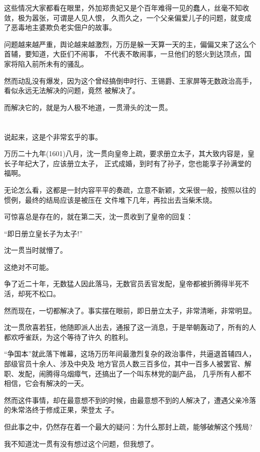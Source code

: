 \documentclass[11pt,a4paper,onecolumn]{article}
\begin{document}
这些情况大家都看在眼里，外加郑贵妃又是个百年难得一见的蠢人，丝毫不知收敛，极为嚣张，可谓是人见人恨，
久而久之，一个父亲偏爱儿子的问题，就变成了恶毒地主婆欺负老实佃户的故事。

问题越来越严重，舆论越来越激烈，万历是躲一天算一天的主，偏偏又来了这么个首辅，要知道，大臣们不闹事，
不代表不敢闹事，一旦他们的怒火到达顶点，国家将陷入前所未有的骚乱。

然而动乱没有爆发，因为这个曾经搞倒申时行、王锡爵、王家屏等无数政治高手，看似永远无法解决的问题，竟然
被解决了。

而解决它的，就是为人极不地道，一贯滑头的沈一贯。

\section[\thesection]{}

说起来，这是个非常玄乎的事。

万历二十九年(1601)八月，沈一贯向皇帝上疏，要求册立太子，其大致内容是，皇长子年纪大了，应该册立太子，
正式成婚，到时有了孙子，您也能享子孙满堂的福啊。

无论怎么看，这都是一封内容平平的奏疏，立意不新颖，文采很一般，按照以往的惯例，最终的结局应该是被压在
文件堆下几年，再拉出去当柴禾烧。

可惊喜总是存在的，就在第二天，沈一贯收到了皇帝的回复：

``即日册立皇长子为太子!''

沈一贯当时就懵了。

这绝对不可能。

争了近二十年，无数猛人因此落马，无数官员丢官发配，皇帝都被折腾得半死不活，却死不松口。

然而现在，一切都解决了。事实摆在眼前，即日册立太子，非常清晰，非常明显。

沈一贯欣喜若狂，他随即派人出去，通报了这一消息，于是举朝轰动了，所有的人都欢呼雀跃，为这个等待了许久
的胜利。

``争国本''就此落下帷幕，这场万历年间最激烈复杂的政治事件，共逼退首辅四人，部级官员十余人、涉及中央及
地方官员人数三百多位，其中一百多人被罢官、解职、发配，闹腾得乌烟瘴气，还搞出了一个叫东林党的副产品，
几乎所有人都不相信，它会有解决的一天。

然而这件事情，却在最意想不到的时候，由最意想不到的人解决了，遭遇父亲冷落的朱常洛终于修成正果，荣登太
子。

但此事之中，仍然存在着一个最大的疑问：为什么那封上疏，能够破解这个残局?

我不知道沈一贯有没有想过这个问题，但我想了。
\end{document}
